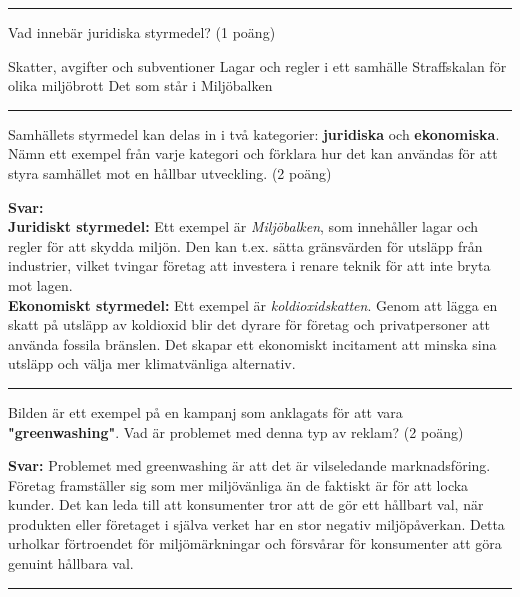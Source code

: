\documentclass{exam}
\begin{document}
\begin{questions}
\vspace{5mm} \hrule \vspace{5mm}

\question Vad innebär juridiska styrmedel? (1 poäng)
\begin{checkboxes}
    \choice Skatter, avgifter och subventioner
    \CorrectChoice Lagar och regler i ett samhälle
    \choice Straffskalan för olika miljöbrott
    \choice Det som står i Miljöbalken
\end{checkboxes}

\vspace{5mm} \hrule \vspace{5mm}

\question Samhällets styrmedel kan delas in i två kategorier: \textbf{juridiska} och \textbf{ekonomiska}. Nämn ett exempel från varje kategori och förklara hur det kan användas för att styra samhället mot en hållbar utveckling. (2 poäng)

\textbf{Svar:} \\
\textbf{Juridiskt styrmedel:} Ett exempel är \textit{Miljöbalken}, som innehåller lagar och regler för att skydda miljön. Den kan t.ex. sätta gränsvärden för utsläpp från industrier, vilket tvingar företag att investera i renare teknik för att inte bryta mot lagen. \\
\textbf{Ekonomiskt styrmedel:} Ett exempel är \textit{koldioxidskatten}. Genom att lägga en skatt på utsläpp av koldioxid blir det dyrare för företag och privatpersoner att använda fossila bränslen. Det skapar ett ekonomiskt incitament att minska sina utsläpp och välja mer klimatvänliga alternativ.

\vspace{5mm} \hrule \vspace{5mm}

\question Bilden är ett exempel på en kampanj som anklagats för att vara \textbf{"greenwashing"}. Vad är problemet med denna typ av reklam? (2 poäng)

\textbf{Svar:} Problemet med greenwashing är att det är vilseledande marknadsföring. Företag framställer sig som mer miljövänliga än de faktiskt är för att locka kunder. Det kan leda till att konsumenter tror att de gör ett hållbart val, när produkten eller företaget i själva verket har en stor negativ miljöpåverkan. Detta urholkar förtroendet för miljömärkningar och försvårar för konsumenter att göra genuint hållbara val.

\vspace{5mm} \hrule \vspace{5mm}


\end{questions}
\end{document}
